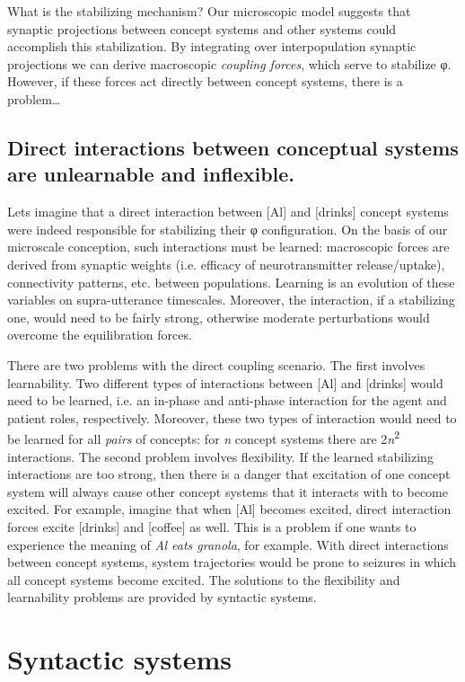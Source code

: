   What is the stabilizing mechanism? Our microscopic model suggests that synaptic projections between concept systems and other systems could accomplish this stabilization. By integrating over interpopulation synaptic projections we can derive macroscopic \textit{coupling forces}, which serve to stabilize φ. However, if these forces act directly between concept systems, there is a problem…

\subsection{Direct interactions between conceptual systems are unlearnable and inflexible.} 

Lets imagine that a direct interaction between [Al] and [drinks] concept systems were indeed responsible for stabilizing their φ configuration. On the basis of our microscale conception, such interactions must be learned: macroscopic forces are derived from synaptic weights (i.e. efficacy of neurotransmitter release/uptake), connectivity patterns, etc. between populations. Learning is an evolution of these variables on supra-utterance timescales. Moreover, the interaction, if a stabilizing one, would need to be fairly strong, otherwise moderate perturbations would overcome the equilibration forces. 

  There are two problems with the direct coupling scenario. The first involves learnability. Two different types of interactions between [Al] and [drinks] would need to be learned, i.e. an in-phase and anti-phase interaction for the agent and patient roles, respectively. Moreover, these two types of interaction would need to be learned for all \textit{pairs} of concepts: for \textit{n} concept systems there are 2\textit{n}\textsuperscript{2} interactions. The second problem involves flexibility. If the learned stabilizing interactions are too strong, then there is a danger that excitation of one concept system will always cause other concept systems that it interacts with to become excited. For example, imagine that when [Al] becomes excited, direct interaction forces excite [drinks] and [coffee] as well. This is a problem if one wants to experience the meaning of \textit{Al eats granola}, for example. With direct interactions between concept systems, system trajectories would be prone to seizures in which all concept systems become excited. The solutions to the flexibility and learnability problems are provided by syntactic systems.

\section{Syntactic systems}

